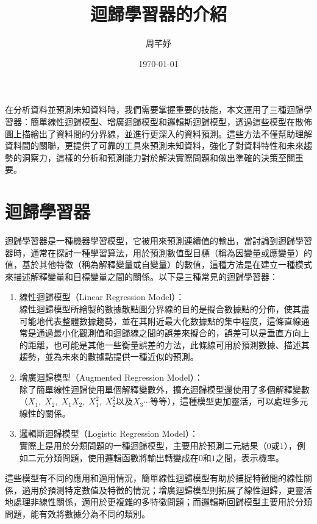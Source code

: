 \documentclass[12pt, a4paper]{article}
\title{迴歸學習器的介紹}
\author{{\SM 周芊妤}}
\date{{\TT \today}}
\begin{document}
\maketitle
\fontsize{12}{22 pt}\selectfont

在分析資料並預測未知資料時，我們需要掌握重要的技能，本文運用了三種迴歸學習器：簡單線性迴歸模型、增廣迴歸模型和邏輯斯迴歸模型，透過這些模型在散佈圖上描繪出了資料間的分界線，並進行更深入的資料預測。這些方法不僅幫助理解資料間的關聯，更提供了可靠的工具來預測未知資料，強化了對資料特性和未來趨勢的洞察力，這樣的分析和預測能力對於解決實際問題和做出準確的決策至關重要。

\section{迴歸學習器}
迴歸學習器是一種機器學習模型，它被用來預測連續值的輸出，當討論到迴歸學習器時，通常在探討一種學習算法，用於預測數值型目標（稱為因變量或應變量）的值，基於其他特徵（稱為解釋變量或自變量）的數值，這種方法是在建立一種模式來描述解釋變量和目標變量之間的關係。以下是三種常見的迴歸學習器：
\begin{enumerate}
\item 線性迴歸模型（Linear Regression Model）：\\
線性迴歸模型所繪製的數據散點圖分界線的目的是擬合數據點的分佈，使其盡可能地代表整體數據趨勢，並在其附近最大化數據點的集中程度，這條直線通常是通過最小化觀測值和迴歸線之間的誤差來擬合的，誤差可以是垂直方向上的距離，也可能是其他一些衡量誤差的方法，此條線可用於預測數據、描述其趨勢，並為未來的數據點提供一種近似的預測。

\item 增廣迴歸模型（Augmented Regression Model）：\\
除了簡單線性迴歸使用單個解釋變數外，擴充迴歸模型還使用了多個解釋變數（\;$X_1,\;X_2,\;X_1X_2,\;X_1^2,\; X_2^2$\;以及\;$X_3 \cdots$\;等等），這種模型更加靈活，可以處理多元線性的關係。

\item 邏輯斯迴歸模型（Logistic Regression Model）：\\
實際上是用於分類問題的一種迴歸模型，主要用於預測二元結果（$0$\;或\;$1$），例如二元分類問題，使用邏輯函數將輸出轉變成在\;$0$\;和\;$1$\;之間，表示機率。
\end{enumerate}

這些模型有不同的應用和適用情況，簡單線性迴歸模型有助於捕捉特徵間的線性關係，適用於預測特定數值及特徵的情況；增廣迴歸模型則拓展了線性迴歸，更靈活地處理非線性關係，適用於更複雜的多特徵問題；而邏輯斯回歸模型主要用於分類問題，能有效將數據分為不同的類別。
\end{document}
